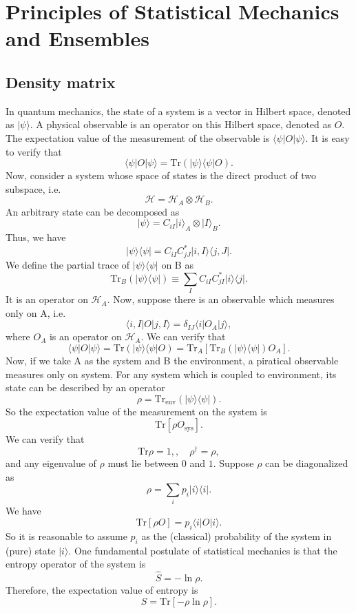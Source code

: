 \chapter{Principles of Statistical Mechanics and Ensembles}
\section{Density matrix}
In quantum mechanics, the state of a system is a vector in Hilbert space, denoted as $|\psi\rangle$. A physical observable is an operator on this Hilbert space, denoted as $O$. The expectation value of the measurement of the observable is $\langle \psi | O | \psi \rangle$. It is easy to verify that
\[\langle \psi | O | \psi \rangle = \mathrm{Tr}(| \psi \rangle \langle \psi | O).\]
Now, consider a system whose space of states is the direct product of two subspace, i.e.
\[\mathcal{H} = \mathcal{H}_A \otimes \mathcal{H}_B.\]
An arbitrary state can be decomposed as
\[|\psi\rangle = C_{iI}|i\rangle_A \otimes |I\rangle_B.\]
Thus, we have
\[| \psi \rangle \langle \psi | = C_{iI}C^*_{jJ} |i,I\rangle \langle j,J |.\]
We define the partial trace of $| \psi \rangle \langle \psi |$ on B as
\[\mathrm{Tr}_B (| \psi \rangle \langle \psi |) \equiv \sum_{I} C_{iI}C^*_{jI} |i\rangle \langle j |.\]
It is an operator on $\mathcal{H}_A$. 
Now, suppose there is an observable which measures only on A, i.e.
\[\langle i,I | O | j,I \rangle = \delta_{IJ} \langle i | O_A | j \rangle,\]
where $O_A$ is an operator on $\mathcal{H}_A$. We can verify that
\[\langle \psi | O | \psi \rangle = \mathrm{Tr}(| \psi \rangle \langle \psi | O) = \mathrm{Tr}_A \left[\mathrm{Tr}_B (| \psi \rangle \langle \psi |) O_A   \right].\]
Now, if we take A as the system and B the environment, a piratical observable measures only on system. For any system which is coupled to environment, its state can be described by an operator
\[\rho = \mathrm{Tr}_{\mathrm{env}} (| \psi \rangle \langle \psi |).\]
So the expectation value of the measurement on the system is
\[\mathrm{Tr}[\rho O_{\mathrm{sys}}].\]
We can verify that
\[\mathrm{Tr}\rho = 1 ,, \quad \rho^{\dagger} = \rho,\]
and any eigenvalue of $\rho$ must lie between $0$ and $1$. 
Suppose $\rho$ can be diagonalized as
\[\rho = \sum_i p_i |i\rangle\langle i |.\]
We have
\[\mathrm{Tr}[\rho O] = p_i \langle i | O | i \rangle.\]
So it is reasonable to assume $p_i$ as the (classical) probability of the system in (pure) state $|i\rangle$.
One fundamental postulate of statistical mechanics is that the entropy operator of the system is
\[\hat{S} = -\ln \rho.\]
Therefore, the expectation value of entropy is
\[S = \mathrm{Tr}[-\rho\ln\rho].\]


